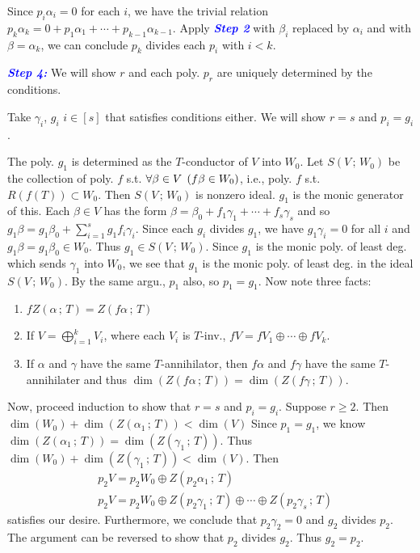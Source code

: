 \documentclass[C:/LATEX/MAS212/Summary/MAS212.tex]{subfiles}
\begin{document}
{    Since $p_i\alpha_i=0$ for each $i$, we have the trivial relation $p_k\alpha_k=0+p_1\alpha_1+\cdots+p_{k-1}\alpha_{k-1}$. Apply \textcolor{blue}{\textit{\textbf{Step 2}}} with $\beta_i$ replaced by $\alpha_i$ and with $\beta=\alpha_k$, we can conclude $p_k$ divides each $p_i$ with $i<k$.

    \textcolor{blue}{\textit{\textbf{Step 4:}}} We will show $r$ and each poly. $p_r$ are uniquely determined by the conditions.

    Take $\gamma_i$, $g_i$ $i\in[s]$ that satisfies conditions either. We will show $r=s$ and $p_i=g_i$.

    The poly. $g_1$ is determined as the $T$-conductor of $V$ into $W_0$. Let $S(V\,;\,W_0)$ be the collection of poly. $f$ s.t. $\forall\beta\in V\;\,(f\beta\in W_0)$, i.e., poly. $f$ s.t. $R(f(T))\subset W_0$. Then $S(V\,;\,W_0)$ is nonzero ideal. $g_1$ is the monic generator of this. Each $\beta\in V$ has the form $\beta=\beta_0+f_1\gamma_1+\cdots+f_s\gamma_s$ and so $g_1\beta=g_1\beta_0+\sum_{i=1}^sg_1f_i\gamma_i$. Since each $g_i$ divides $g_1$, 
    we have $g_1\gamma_i=0$ for all $i$ and $g_1\beta=g_1\beta_0\in W_0$. Thus $g_1\in S(V\,;\,W_0)$. Since $g_1$ is the monic poly. of least deg. which sends $\gamma_1$ into $W_0$, we see that $g_1$ is the monic poly. of least deg. in the ideal $S(V\,;\,W_0)$. By the same argu., $p_1$ also, so $p_1=g_1$. Now note three facts:
    \begin{enumerate}
        \item $fZ(\alpha\,;\,T)=Z(f\alpha\,;\,T)$
        \item If $V=\bigoplus_{i=1}^kV_i$, where each $V_i$ is $T$-inv., $fV=fV_1\oplus\cdots\oplus fV_k$.
        \item If $\alpha$ and $\gamma$ have the same $T$-annihilator, then $f\alpha$ and $f\gamma$ have the same $T$-annihilater and thus $\dim(Z(f\alpha\,;\,T))=\dim(Z(f\gamma\,;\,T))$.
    \end{enumerate}
    Now, proceed induction to show that $r=s$ and $p_i=g_i$. Suppose $r\geq2$. Then $\dim(W_0)+\dim(Z(\alpha_1\,;\,T))<\dim(V)$ Since $p_1=g_1$, we know $\dim(Z(\alpha_1\,;\,T))=\dim(Z(\gamma_1\,;\,T))$. Thus $\dim(W_0)+\dim(Z(\gamma_1\,;\,T))<\dim(V)$. Then
    \begin{align*}
        & p_2V=p_2W_0\oplus Z(p_2\alpha_1\,;\,T) \\
        & p_2V=p_2W_0\oplus Z(p_2\gamma_1\,;\,T)\oplus\cdots\oplus Z(p_2\gamma_s\,;\,T)
    \end{align*}
    satisfies our desire. Furthermore, we conclude that $p_2\gamma_2=0$ and $g_2$ divides $p_2$. The argument can be reversed to show that $p_2$ divides $g_2$. Thus $g_2=p_2$.
}
\end{document}
